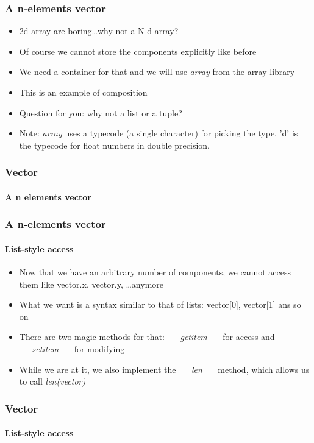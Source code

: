 \documentclass[9pt]{beamer}
\begin{document}
\begin{frame}
  \frametitle{A n-elements vector}

  \begin{itemize}
    \item 2d array are boring\dots why not a N-d array?
    \medskip
    \item Of course we cannot store the components explicitly like before
    \medskip
    \item We need a container for that and we will use \emph{array} from the
          array library
    \medskip
    \item This is an example of \alert{composition}
    \medskip
    \item Question for you: why not a list or a tuple?
    \medskip
    \item Note: \emph{array} uses a typecode (a single character) for picking the
          type. 'd' is the typecode for float numbers in double precision.
  \end{itemize}

\end{frame}


\begin{frame}
  \frametitle{Vector}
  \framesubtitle{A n elements vector}
  
\end{frame}


\begin{frame}
  \frametitle{A n-elements vector}
  \framesubtitle{List-style access}

  \begin{itemize}
    \item Now that we have an arbitrary number of components, we cannot access them like
          vector.x, vector.y, \dots anymore
    \medskip
    \item What we want is a syntax similar to that of lists: vector[0], vector[1]
          ans so on
    \medskip
    \item There are two magic methods for that: \emph{\_\_getitem\_\_} for access
          and \emph{\_\_setitem\_\_} for modifying
    \medskip
    \item While we are at it, we also implement the \emph{\_\_len\_\_} method,
          which allows us to call \emph{len(vector)}
  \end{itemize}

\end{frame}


\begin{frame}
  \frametitle{Vector}
  \framesubtitle{List-style access}
  
\end{frame}
\end{document}
